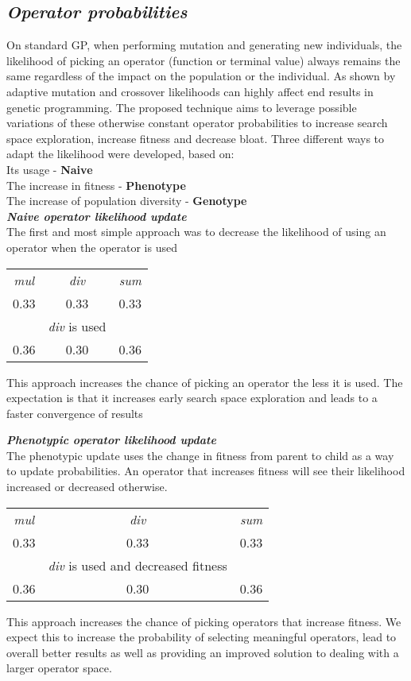 \documentclass[12pt]{article}
\begin{document}
\subsection*{\textit{Operator probabilities}}
On standard GP, when performing mutation and generating new individuals, the likelihood of picking an operator (function or terminal value) always remains the same regardless of the impact on the population or the individual. \hfill \break
As shown by \cite{eurogp2001} adaptive mutation and crossover likelihoods can highly affect end results in genetic programming. The proposed technique aims to leverage possible variations of these otherwise constant operator probabilities to increase search space exploration, increase fitness and decrease bloat.
Three different ways to adapt the likelihood were developed, based on: \\
\indent Its usage - \textbf{Naive} \\
\indent The increase in fitness - \textbf{Phenotype} \\
\indent The increase of population diversity - \textbf{Genotype} \\

\textbf{\textit{Naive operator likelihood update}}  \\
The first and most simple approach was to decrease the likelihood of using an operator when the operator is used

\begin{center}
\begin{tabular}{ c c c }
 \textit{mul} & \textit{div} & \textit{sum} \\
 0.33 & 0.33 & 0.33 \\
   & \textit{div} is used &  \\
 0.36 & 0.30 & 0.36
\end{tabular}
\end{center}
This approach increases the chance of picking an operator the less it is used. The expectation is that it increases early search space exploration and leads to a faster convergence of results
\break

\textbf{\textit{Phenotypic operator likelihood update}}  \\
The phenotypic update uses the change in fitness from parent to child as a way to update probabilities. An operator that increases fitness will see their likelihood increased or decreased otherwise.
\begin{center}
\begin{tabular}{ c c c }
 \textit{mul} & \textit{div} & \textit{sum} \\
 0.33 & 0.33 & 0.33 \\
   & \textit{div} is used and decreased fitness &  \\
 0.36 & 0.30 & 0.36
\end{tabular}
\end{center}
This approach increases the chance of picking operators that increase fitness. We expect this to increase the probability of selecting meaningful operators, lead to overall better results as well as providing an improved solution to dealing with a larger operator space. \hfill
\break
\end{document}
